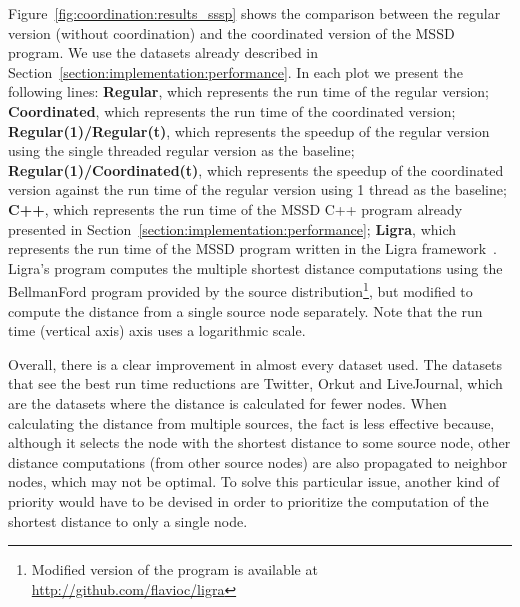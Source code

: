 \begin{table}[ht]
   \begin{center}
      
   \end{center}


   \label{table:coordination:sssp_stats}
\end{table}

Figure~\ref{fig:coordination:results_sssp} shows the comparison between the
regular version (without coordination) and the coordinated version of the MSSD
program. We use the datasets already described in
Section~\ref{section:implementation:performance}.  In each plot we present the
following lines: \textbf{Regular}, which represents the run time of the regular
version; \textbf{Coordinated}, which represents the run time of the coordinated
version; \textbf{Regular(1)/Regular(t)}, which represents the speedup of the
regular version using the single threaded regular version as the baseline;
\textbf{Regular(1)/Coordinated(t)}, which represents the speedup of the
coordinated version against the run time of the regular version using 1 thread
as the baseline; \textbf{C++}, which represents the run time of the MSSD C++
program already presented in Section~\ref{section:implementation:performance};
\textbf{Ligra}, which represents the run time of the MSSD program written in the
Ligra framework~\cite{Shun:2013:LLG:2517327.2442530}. Ligra's program computes
the multiple shortest distance computations using the BellmanFord program
provided by the source distribution\footnote{Modified version of the program is
available at \url{http://github.com/flavioc/ligra}}, but modified to compute
the distance from a single source node separately.  Note that the run time
(vertical axis) axis uses a logarithmic scale.

Overall, there is a clear improvement in almost every dataset used. The datasets
that see the best run time reductions are Twitter, Orkut and LiveJournal, which
are the datasets where the distance is calculated for fewer nodes. When
calculating the distance from multiple sources, the  fact is
less effective because, although it selects the node with the shortest distance
to some source node, other distance computations (from other source nodes) are
also propagated to neighbor nodes, which may not be optimal. To solve this
particular issue, another kind of priority would have to be devised in order to
prioritize the computation of the shortest distance to only a single node.

